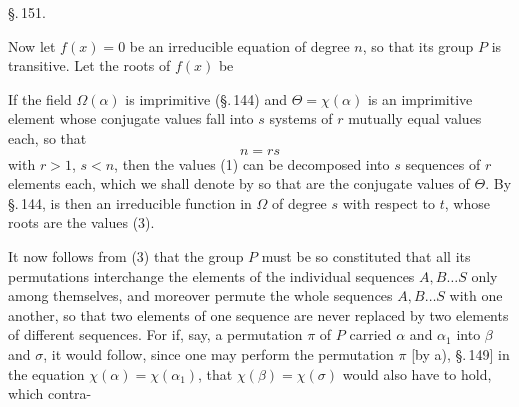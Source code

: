 \begin{center}
\S.\,151.

\end{center}

Now let $f(x) = 0$ be an irreducible equation of degree $n$, so that its
 group $P$ is transitive. Let the roots of $f(x)$ be

If the field $\Omega(\alpha)$ is imprimitive (\S.\,144) and
$\Theta = \chi(\alpha)$ is an imprimitive element whose conjugate values fall
into $s$ systems of $r$ mutually equal values each, so that
\[
n = rs
\]
with $r > 1$, $s < n$, then the values (1) can be decomposed into $s$
sequences of $r$ elements each, which we shall denote by
so that
are the conjugate values of $\Theta$. By \S.\,144,
is then an irreducible function in $\Omega$ of degree $s$ with respect to $t$,
whose roots are the values (3).

It now follows from (3) that the group $P$ must be so constituted that
all its permutations interchange the elements of the individual sequences
$A, B \ldots S$ only among themselves, and moreover permute the whole
sequences $A, B \ldots S$ with one another, so that two elements of one
sequence are never replaced by two elements of different sequences. For if,
say, a permutation $\pi$ of $P$ carried $\alpha$ and $\alpha_1$ into $\beta$
and $\sigma$, it would follow, since one may perform the permutation $\pi$
[by a), \S.\,149] in the equation $\chi(\alpha) = \chi(\alpha_1)$, that
$\chi(\beta) = \chi(\sigma)$ would also have to hold, which contra-
